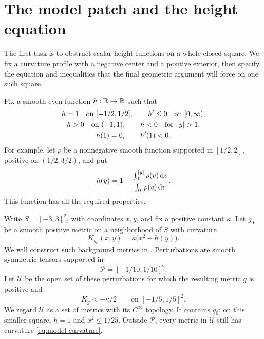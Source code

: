 \section{The model patch and the height equation}\label{sec:model}

The first task is to obstruct scalar height functions on a whole
closed square. We fix a curvature profile with a negative center
and a positive exterior, then specify the equation and inequalities
that the final geometric argument will force on one such square.

Fix a smooth even function \(h:\mathbb R\to\mathbb R\) such that
\begin{equation}\label{eq:h}
\begin{gathered}
h=1 \quad\text{on }[-1/2,1/2],\qquad h'\le0\quad\text{on }[0,\infty),\\
h>0\quad\text{on }(-1,1),\qquad h<0\quad\text{for }\left\lvert y\right\rvert>1,\\
h(1)=0,\qquad h'(1)<0.
\end{gathered}
\end{equation}
For example, let \(\rho\) be a nonnegative smooth function supported
in \([1/2,2]\), positive on \((1/2,3/2)\), and put
\[
h(y)=1-\frac{\int_0^{\left\lvert y\right\rvert}\rho(v)\,\mathrm d v}
                  {\int_0^1\rho(v)\,\mathrm d v}.
\]
This function has all the required properties.

Write \(S=[-3,3]^2\), with coordinates \(x,y\), and fix a positive
constant \(\kappa\). Let \(g_0\) be a smooth positive metric on a
neighborhood of \(S\) with curvature
\begin{equation}\label{eq:model-curvature}
K_{g_0}(x,y)=\kappa\bigl(x^2-h(y)\bigr).
\end{equation}
We will construct such background metrics in .
Perturbations are smooth symmetric tensors supported in
\[
\mathcal P=[-1/10,1/10]^2.
\]
Let \(\mathcal U\) be the open set of these perturbations for which
the resulting metric \(g\) is positive and
\begin{equation}\label{eq:negative-box}
K_g<-\kappa/2\qquad\text{on }[-1/5,1/5]^2.
\end{equation}
We regard \(\mathcal U\) as a set of metrics with its \(C^\infty\)
topology. It contains \(g_0\): on this smaller square,
\(h=1\) and \(x^2\le1/25\). Outside \(\mathcal P\), every metric
in \(\mathcal U\) still has curvature \eqref{eq:model-curvature}.

